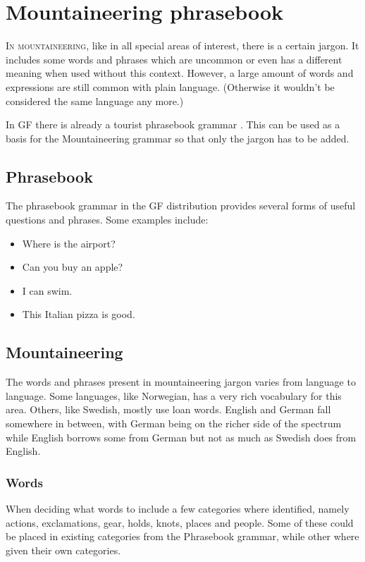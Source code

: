 \chapter{Mountaineering phrasebook}
\lettrine[lines=4, loversize=-0.1, lraise=0.1]{I}{n mountaineering}, like in all special areas of interest, there is a certain jargon. It includes some words and phrases which are uncommon or even has a different meaning when used without this context. However, a large amount of words and expressions are still common with plain language. (Otherwise it wouldn't be considered the same language any more.)

In GF there is already a tourist phrasebook grammar \cite{phrasebook}. This can be used as a basis for the Mountaineering grammar so that only the jargon has to be added.


\section{Phrasebook}
The phrasebook grammar in the GF distribution provides several forms of useful questions and phrases. Some examples include:
\begin{itemize}
\item Where is the airport?
\item Can you buy an apple?
\item I can swim.
\item This Italian pizza is good.
\end{itemize}


\section{Mountaineering}
The words and phrases present in mountaineering jargon varies from language to language. Some languages, like Norwegian, has a very rich vocabulary for this area. Others, like Swedish, mostly use loan words. English and German fall somewhere in between, with German being on the richer side of the spectrum while English borrows some from German but not as much as Swedish does from English. \cite{loanwords}


\subsection{Words}
\label{sec:words}
When deciding what words to include a few categories where identified, namely actions, exclamations, gear, holds, knots, places and people. Some of these could be placed in existing categories from the Phrasebook grammar, while other where given their own categories.


